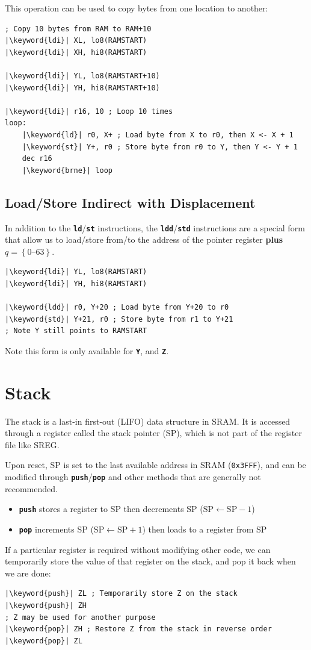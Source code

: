 \documentclass{report}
\newcommand{\keyword}[1]{\textcolor[rgb]{0.00,0.50,0.00}{\textbf{#1}}}
\newcommand{\keywordinline}[1]{\textcolor[rgb]{0.00,0.50,0.00}{\textbf{\texttt{#1}}}}
\begin{document}
This operation can be used to copy bytes from one location to another:
\begin{verbatim}
; Copy 10 bytes from RAM to RAM+10
|\keyword{ldi}| XL, lo8(RAMSTART)
|\keyword{ldi}| XH, hi8(RAMSTART)

|\keyword{ldi}| YL, lo8(RAMSTART+10)
|\keyword{ldi}| YH, hi8(RAMSTART+10)

|\keyword{ldi}| r16, 10 ; Loop 10 times
loop:
    |\keyword{ld}| r0, X+ ; Load byte from X to r0, then X <- X + 1
    |\keyword{st}| Y+, r0 ; Store byte from r0 to Y, then Y <- Y + 1
    dec r16
    |\keyword{brne}| loop
\end{verbatim}
\subsection{Load/Store Indirect with Displacement}
In addition to the \keywordinline{ld}/\keywordinline{st} instructions, the \keywordinline{ldd}/\keywordinline{std}
instructions are a special form that allow us to load/store from/to the address of the pointer register
\textbf{plus} \(q = \left\{ \numrange{0}{63} \right\}\).
\begin{verbatim}
|\keyword{ldi}| YL, lo8(RAMSTART)
|\keyword{ldi}| YH, hi8(RAMSTART)

|\keyword{ldd}| r0, Y+20 ; Load byte from Y+20 to r0
|\keyword{std}| Y+21, r0 ; Store byte from r1 to Y+21
; Note Y still points to RAMSTART
\end{verbatim}
Note this form is only available for \keywordinline{Y}, and \keywordinline{Z}.
\section{Stack}
The stack is a last-in first-out (LIFO) data structure in SRAM\@.
It is accessed through a register called the stack pointer (SP),
which is not part of the register file like SREG\@.

Upon reset, SP is set to the last available address in SRAM (\texttt{0x3FFF}), %
and can be modified through \keywordinline{push}/\keywordinline{pop} and other methods that are generally not recommended.
\begin{itemize}
    \item \keywordinline{push} stores a register to SP then decrements SP (\(\mathrm{SP} \leftarrow \mathrm{SP} - 1\))
    \item \keywordinline{pop} increments SP (\(\mathrm{SP} \leftarrow \mathrm{SP} + 1\)) then loads to a register from SP
\end{itemize}
If a particular register is required without modifying other code, we can temporarily
store the value of that register on the stack, and pop it back when we are done:
\begin{verbatim}
|\keyword{push}| ZL ; Temporarily store Z on the stack
|\keyword{push}| ZH
; Z may be used for another purpose
|\keyword{pop}| ZH ; Restore Z from the stack in reverse order
|\keyword{pop}| ZL
\end{verbatim}
\end{document}
